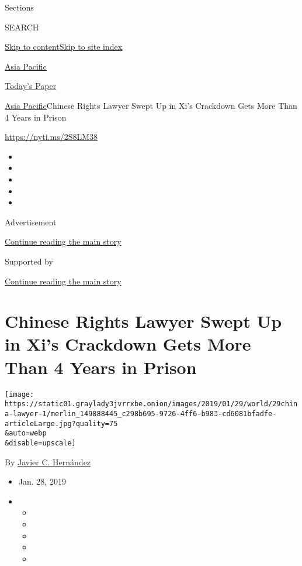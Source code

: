 Sections

SEARCH

\protect\hyperlink{site-content}{Skip to
content}\protect\hyperlink{site-index}{Skip to site index}

\href{https://www.nytimes3xbfgragh.onion/section/world/asia}{Asia
Pacific}

\href{https://myaccount.nytimes3xbfgragh.onion/auth/login?response_type=cookie\&client_id=vi}{}

\href{https://www.nytimes3xbfgragh.onion/section/todayspaper}{Today's
Paper}

\href{/section/world/asia}{Asia Pacific}\textbar{}Chinese Rights Lawyer
Swept Up in Xi's Crackdown Gets More Than 4 Years in Prison

\url{https://nyti.ms/2S8LM38}

\begin{itemize}
\item
\item
\item
\item
\item
\end{itemize}

Advertisement

\protect\hyperlink{after-top}{Continue reading the main story}

Supported by

\protect\hyperlink{after-sponsor}{Continue reading the main story}

\hypertarget{chinese-rights-lawyer-swept-up-in-xis-crackdown-gets-more-than-4-years-in-prison}{%
\section{Chinese Rights Lawyer Swept Up in Xi's Crackdown Gets More Than
4 Years in
Prison}\label{chinese-rights-lawyer-swept-up-in-xis-crackdown-gets-more-than-4-years-in-prison}}

\texttt{[image: https://static01.graylady3jvrrxbe.onion/images/2019/01/29/world/29china-lawyer-1/merlin\_149888445\_c298b695-9726-4ff6-b983-cd6081bfadfe-articleLarge.jpg?quality=75\\\&auto=webp\\\&disable=upscale]}

By
\href{https://www.nytimes3xbfgragh.onion/by/javier-c-hernandez}{Javier
C. Hernández}

\begin{itemize}
\item
  Jan. 28, 2019
\item
  \begin{itemize}
  \item
  \item
  \item
  \item
  \item
  \end{itemize}
\end{itemize}

